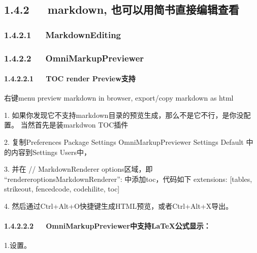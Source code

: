 \documentclass[letterpaper,12pt,english]{sphinxmanual}
\begin{document}
\subsection{1.4.2   markdown, 也可以用简书直接编辑查看}
\label{\detokenize{001software/001install/sublime:markdown}}

\subsubsection{1.4.2.1   MarkdownEditing}
\label{\detokenize{001software/001install/sublime:markdownediting}}

\subsubsection{1.4.2.2   OmniMarkupPreviewer}
\label{\detokenize{001software/001install/sublime:omnimarkuppreviewer}}

\paragraph{1.4.2.2.1   TOC render Preview支持}
\label{\detokenize{001software/001install/sublime:toc-render-preview}}
右键menu preview markdown in browser, export/copy markdown as html

\begin{sphinxVerbatim}[commandchars=\\\{\}]
1. 如果你发现它不支持markdown目录的预览生成，那么不是它不行，是你没配置。
   当然首先是装markdwon TOC插件

2. 复制Preferences \PYGZhy{}\PYGZgt{} Package Settings \PYGZhy{}\PYGZgt{} OmniMarkupPreviewer \PYGZhy{}\PYGZgt{} Settings \PYGZhy{} Default 中的内容到Settings \PYGZhy{} Users中，

3. 并在 // MarkdownRenderer options区域，即
“renderer\PYGZus{}options\PYGZhy{}MarkdownRenderer”: 中添加\PYGZdq{}toc\PYGZdq{}，代码如下
        \PYGZdq{}extensions\PYGZdq{}: [\PYGZdq{}tables\PYGZdq{}, \PYGZdq{}strikeout\PYGZdq{}, \PYGZdq{}fenced\PYGZus{}code\PYGZdq{}, \PYGZdq{}codehilite\PYGZdq{}, \PYGZdq{}toc\PYGZdq{}]

4. 然后通过Ctrl+Alt+O快捷键生成HTML预览，或者Ctrl+Alt+X导出。
\end{sphinxVerbatim}


\paragraph{1.4.2.2.2   OmniMarkupPreviewer中支持LaTeX公式显示：}
\label{\detokenize{001software/001install/sublime:omnimarkuppreviewerlatex}}
1.设置。
\end{document}
